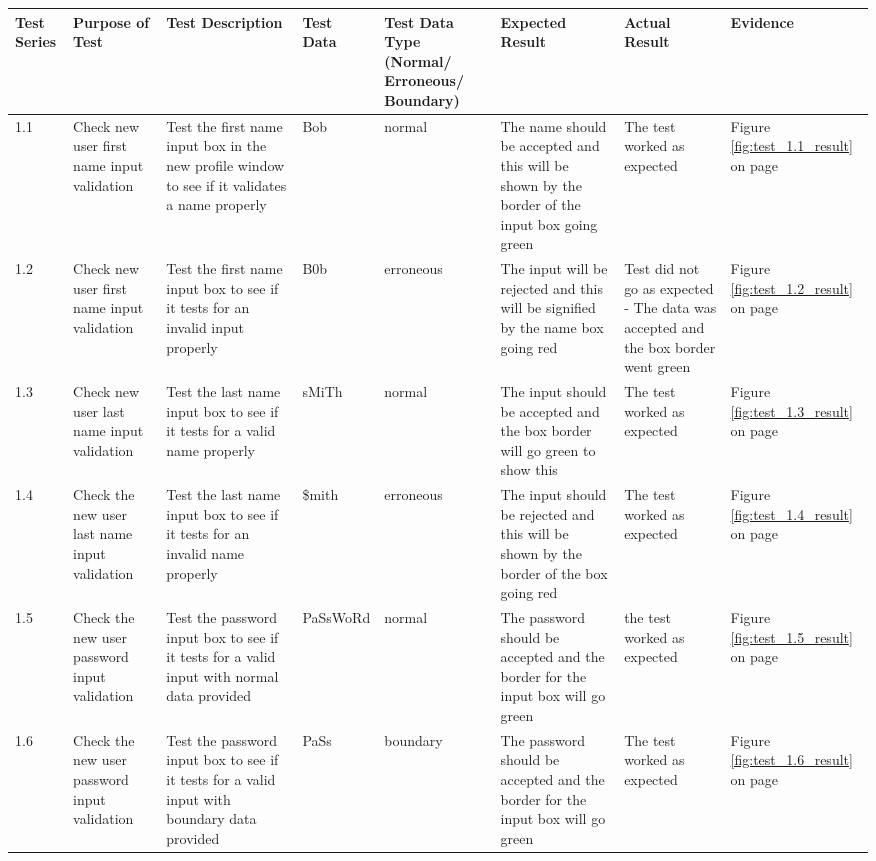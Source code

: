 \begin{landscape}
\begin{center}
    \begin{longtable}{|p{1.5cm}|p{2.5cm}|p{2.5cm}|p{2cm}|p{2cm}|p{2cm}|p{2cm}|p{2cm}|}
        \hline
        \textbf{Test Series} & \textbf{Purpose of Test} & \textbf{Test Description} & \textbf{Test Data} & \textbf{Test Data Type (Normal/ Erroneous/ Boundary)} & \textbf{Expected Result} & \textbf{Actual Result} & \textbf{Evidence}\\ \hline
       1.1 & Check new user first name input validation & Test the first name input box in the new profile window to see if it validates a name properly & Bob & normal & The name should be accepted and this will be shown by the border of the input box going green & The test worked as expected & Figure \ref{fig:test_1.1_result} on page \pageref{fig:test_1.1_result} \\ \hline
       1.2 & Check new user first name input validation & Test the first name input box to see if it tests for an invalid input properly & B0b & erroneous & The input will be rejected and this will be signified by the name box going red & Test did not go as expected - The data was accepted and the box border went green & Figure \ref{fig:test_1.2_result} on page \pageref{fig:test_1.2_result}\\ \hline
       1.3 & Check new user last name input validation & Test the last name input box to see if it tests for a valid name properly & sMiTh & normal & The input should be accepted and the box border will go green to show this & The test worked as expected & Figure \ref{fig:test_1.3_result} on page \pageref{fig:test_1.3_result}\\ \hline
       1.4 & Check the new user last name input validation & Test the last name input box to see if it tests for an invalid name properly & \$mith & erroneous & The input should be rejected and this will be shown by the border of the box going red & The test worked as expected & Figure \ref{fig:test_1.4_result} on page \pageref{fig:test_1.4_result}\\ \hline
       1.5 & Check the new user password input validation & Test the password input box to see if it tests for a valid input with normal data provided & PaSsWoRd & normal & The password should be accepted and the border for the input box will go green & the test worked as expected & Figure \ref{fig:test_1.5_result} on page \pageref{fig:test_1.5_result} \\ \hline
       1.6 & Check the new user password input validation & Test the password input box to see if it tests for a valid input with boundary data provided & PaSs & boundary & The password should be accepted and the border for the input box will go green & The test worked as expected &  Figure \ref{fig:test_1.6_result} on page \pageref{fig:test_1.6_result}\\ \hline

\end{longtable}
\end{center}
\end{landscape}
